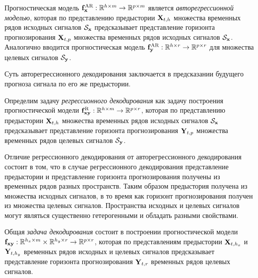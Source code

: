 \documentclass[11pt, a5paper]{dissert}
\begin{document}
\begin{definition}
	\label{ch1:def:autoreg_model}
	Прогностическая модель $\mathbf{f}^{\text{AR}}_{\mathbf{x}}: \mathbb{R}^{h \times m} \rightarrow \mathbb{R}^{p \times m}$ является \textit{авторегрессионной моделью}, которая по представлению предыстории $\mathbf{X}_{t,h}$ множества временных рядов исходных сигналов $\mathcal{S}_{\mathbf{x}}$ предсказывает представление горизонта прогнозирования $\mathbf{X}_{t,p}$ множества временных рядов исходных сигналов $\mathcal{S}_{\mathbf{x}}$.
	Аналогично вводится прогностическая модель $\mathbf{f}^{\text{AR}}_{\mathbf{y}}: \mathbb{R}^{h \times r} \rightarrow \mathbb{R}^{p \times r}$ для множества целевых сигналов $\mathcal{S}_{\mathbf{y}}$.
\end{definition}
Суть авторегрессионного декодирования заключается в предсказании будущего прогноза сигнала по его же предыстории.

\begin{definition}
	\label{ch1:def:reg_model}
	Определим задачу \textit{регрессионного декодирования} как задачу построения прогностической модели $\mathbf{f}^{\text{R}}_{\mathbf{x}\mathbf{y}}: \mathbb{R}^{h \times m} \rightarrow \mathbb{R}^{p \times r}$, которая по представлению предыстории $\mathbf{X}_{t,h}$ множества временных рядов исходных сигналов $\mathcal{S}_{\mathbf{x}}$ предсказывает представление горизонта прогнозирования $\mathbf{Y}_{t,p}$ множества временных рядов целевых сигналов $\mathcal{S}_{\mathbf{y}}$.
\end{definition}

Отличие регрессионного декодирования от авторегрессионного декодирования состоит в том, что в случае регрессионного декодирования представление предыстории и представление горизонта прогнозирования получены из временных рядов разных пространств. 
Таким образом предыстория получена из множества исходных сигналов, в то время как горизонт прогнозирования получен из множества целевых сигналов. 
Пространства исходных и целевых сигналов могут являться существенно гетерогенными и обладать разными свойствами.

\begin{definition}
	\label{ch1:def:decode_model}
	Общая \textit{задача декодирования} состоит в построении прогностической модели $\mathbf{f}_{\mathbf{x}\mathbf{y}}: \mathbb{R}^{h_x \times m} \times \mathbb{R}^{h_y \times r} \rightarrow \mathbb{R}^{p \times r}$, которая по представлениям предыстории $\mathbf{X}_{t,h_x}$ и $\mathbf{Y}_{t,h_y}$ временных рядов исходных и целевых сигналов предсказывает представление горизонта прогнозирования $\mathbf{Y}_{t,r}$ временных рядов целевых сигналов. 
\end{definition}
\end{document}
